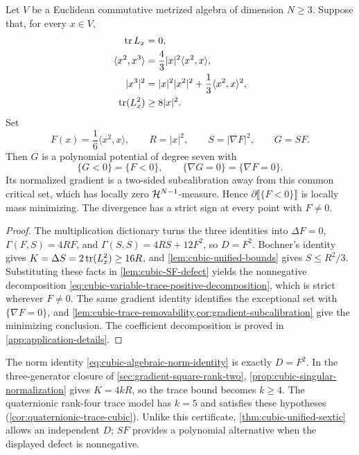 \begin{corollary}
\label{thm:cubic-algebraic-trace-certificate}
Let \(V\) be a Euclidean commutative metrized algebra of dimension
\(N\ge3\). Suppose that, for every $x\in V$,
\begin{align}
 \operatorname{tr} L_x&=0,\label{eq:cubic-algebraic-trace-zero}\\
 \langle x^2,x^3\rangle
 &=\frac43|x|^2\langle x^2,x\rangle,
 \label{eq:cubic-algebraic-radial-identity}\\
 |x^3|^2&=|x|^2|x^2|^2+
                  \frac13\langle x^2,x\rangle^2,
 \label{eq:cubic-algebraic-norm-identity}\\
 \operatorname{tr}(L_x^2)&\ge8|x|^2.
 \label{eq:cubic-algebraic-trace-bound}
\end{align}
Set
\[
 F(x)=\frac16\langle x^2,x\rangle,\qquad
 R=|x|^2,\qquad S=|\nabla F|^2,\qquad G=SF.
\]
Then $G$ is a polynomial potential of degree seven with
\[
 \{G<0\}=\{F<0\},\qquad
 \{\nabla G=0\}=\{\nabla F=0\}.
\]
Its normalized gradient is a two-sided subcalibration away from
this common critical set, which has locally zero
$\mathcal H^{N-1}$-measure. Hence
$\partial\llbracket\{F<0\}\rrbracket$ is locally mass minimizing.
The divergence has a strict sign at every point with $F\ne0$.
\end{corollary}

\begin{proof}
The multiplication dictionary turns the three identities into
\(\Delta F=0\), \(\Gamma(F,S)=4RF\), and
\(\Gamma(S,S)=4RS+12F^2\), so \(D=F^2\).
Bochner's identity gives \(K=\Delta S=2\operatorname{tr}(L_x^2)\ge16R\),
and \cref{lem:cubic-unified-bounds} gives \(S\le R^2/3\).
Substituting these facts in \cref{lem:cubic-SF-defect} yields the
nonnegative decomposition
\eqref{eq:cubic-variable-trace-positive-decomposition}, which is
strict wherever \(F\ne0\). The same gradient identity identifies
the exceptional set with \(\{\nabla F=0\}\), and
\cref{lem:cubic-trace-removability,cor:gradient-subcalibration}
give the minimizing conclusion. The coefficient decomposition is proved in
\cref{app:application-details}.
\end{proof}

\begin{remark}
\label{rem:cubic-algebraic-certificate-scope}
The norm identity \eqref{eq:cubic-algebraic-norm-identity} is exactly
\(D=F^2\). In the three-generator closure of
\cref{sec:gradient-square-rank-two},
\cref{prop:cubic-singular-normalization} gives \(K=4kR\), so the
trace bound becomes \(k\ge4\). The quaternionic rank-four trace
model has \(k=5\) and satisfies these hypotheses
(\cref{cor:quaternionic-trace-cubic}). Unlike this certificate,
\cref{thm:cubic-unified-sextic} allows an independent \(D\);
\(SF\) provides a polynomial alternative when the displayed defect
is nonnegative.
\end{remark}

